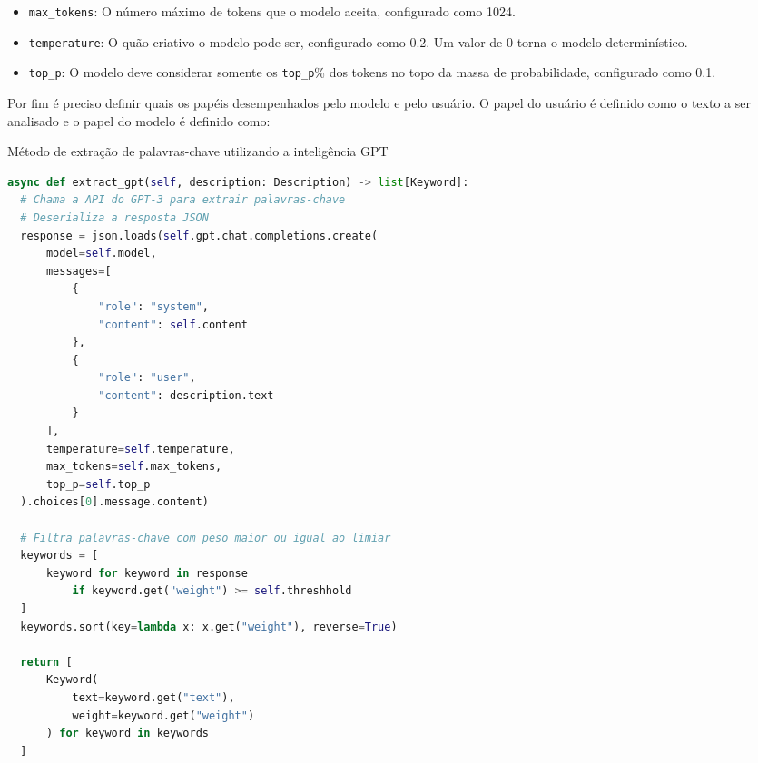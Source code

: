 \begin{itemize}
  \item \texttt{max\_tokens}: O número máximo de tokens que o modelo aceita, configurado como 1024.
  \item \texttt{temperature}: O quão criativo o modelo pode ser, configurado como 0.2. Um valor de 0 torna o modelo determinístico.
  \item \texttt{top\_p}: O modelo deve considerar somente os \texttt{top\_p}\% dos tokens no topo da massa de probabilidade, configurado como 0.1.
\end{itemize}

Por fim é preciso definir quais os papéis desempenhados pelo modelo e pelo usuário. O papel do usuário é definido como o texto a ser analisado e o papel do modelo é definido como:


\begin{sourcecode}[H]
  \caption{\label{codigo:extract-gpt}Método de extração de palavras-chave utilizando a inteligência GPT}
  \begin{lstlisting}[frame=single, language=Python]
async def extract_gpt(self, description: Description) -> list[Keyword]:
  # Chama a API do GPT-3 para extrair palavras-chave
  # Deserializa a resposta JSON
  response = json.loads(self.gpt.chat.completions.create(
      model=self.model,
      messages=[
          {
              "role": "system",
              "content": self.content
          },
          {
              "role": "user",
              "content": description.text
          }
      ],
      temperature=self.temperature,
      max_tokens=self.max_tokens,
      top_p=self.top_p
  ).choices[0].message.content)

  # Filtra palavras-chave com peso maior ou igual ao limiar
  keywords = [
      keyword for keyword in response 
          if keyword.get("weight") >= self.threshhold
  ]
  keywords.sort(key=lambda x: x.get("weight"), reverse=True)

  return [
      Keyword(
          text=keyword.get("text"), 
          weight=keyword.get("weight")
      ) for keyword in keywords
  ]
\end{lstlisting}
  \fonte{}
\end{sourcecode}

